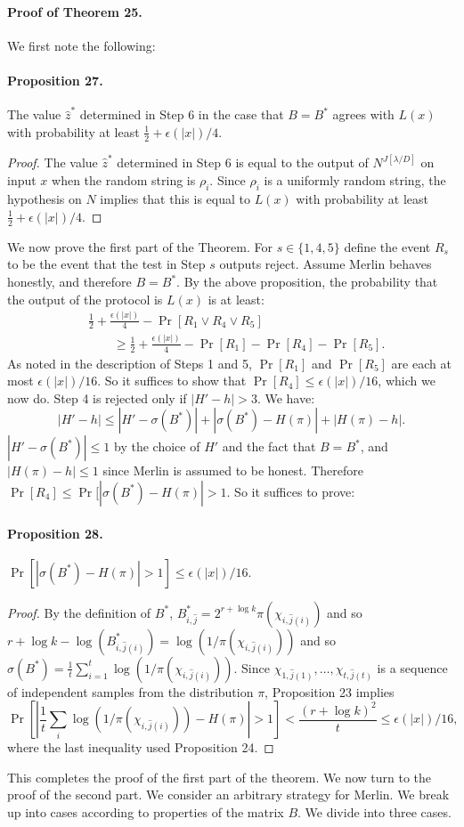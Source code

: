 \paragraph{Proof of Theorem 25.} We first note the following:
\paragraph{Proposition 27.} The value $\hat z^*$ determined in Step 6 in the case that $B=B^*$ agrees with $L(x)$ with probability at least $\frac12+\epsilon(|x|)/4$.
\begin{proof}The value $\hat z^*$ determined in Step 6 is equal to the output of $N^{J[\lambda/D]}$ on input $x$ when the random string is $\rho_{\hat i}$. Since $\rho_{\hat i}$ is a uniformly random string, the hypothesis on $N$ implies that this is equal to $L(x)$ with probability at least $\frac12+\epsilon(|x|)/4$.\end{proof}
We now prove the first part of the Theorem. For $s\in\{1,4,5\}$ define the event $R_s$ to be the event that the test in Step $s$ outputs reject. Assume Merlin behaves honestly, and therefore $B=B^*$. By the above proposition, the probability that the output of the protocol is $L(x)$ is at least:
\begin{align*}
&\frac12+\frac{\epsilon(|x|)}4-\Pr[R_1\lor R_4\lor R_5]\\
&\qquad\ge\frac12+\frac{\epsilon(|x|)}4-\Pr[R_1]-\Pr[R_4]-\Pr[R_5].
\end{align*}
As noted in the description of Steps 1 and 5, $\Pr[R_1]$ and $\Pr[R_5]$ are each at most $\epsilon(|x|)/16$. So it suffices to show that $\Pr[R_4]\le\epsilon(|x|)/16$, which we now do. Step 4 is rejected only if $|H'-h|>3$. We have:
\[|H'-h|\le|H'-\sigma(B^*)|+|\sigma(B^*)-H(\pi)|+|H(\pi)-h|.\]
$|H'-\sigma(B^*)|\le1$ by the choice of $H'$ and the fact that $B=B^*$, and $|H(\pi)-h|\le1$ since Merlin is assumed to be honest. Therefore $\Pr[R_4]\le\Pr[|\sigma(B^*)-H(\pi)|>1$. So it suffices to prove:
\paragraph{Proposition 28.} $\Pr[|\sigma(B^*)-H(\pi)|>1]\le\epsilon(|x|)/16$.
\begin{proof}By the definition of $B^*$, $B^*_{i,\hat j}=2^{r+\log k}\pi(\chi_{i,\hat j(i)})$ and so $r+\log k-\log(B^*_{i,\hat j(i)})=\log(1/\pi(\chi_{i,\hat j(i)}))$ and so $\sigma(B^*)=\frac1t\sum_{i=1}^t\log(1/\pi(\chi_{i,\hat j(i)}))$. Since $\chi_{1,\hat j(1)},\ldots,\chi_{t,\hat j(t)}$ is a sequence of independent samples from the distribution $\pi$, Proposition 23 implies
\[\Pr\left[\left|\frac1t\sum_i\log(1/\pi(\chi_{i,\hat j(i)}))-H(\pi)\right|>1\right]<\frac{(r+\log k)^2}t\le\epsilon(|x|)/16,\]
where the last inequality used Proposition 24.\end{proof}
This completes the proof of the first part of the theorem. We now turn to the proof of the second part. We consider an arbitrary strategy for Merlin. We break up into cases according to properties of the matrix $B$. We divide into three cases.
